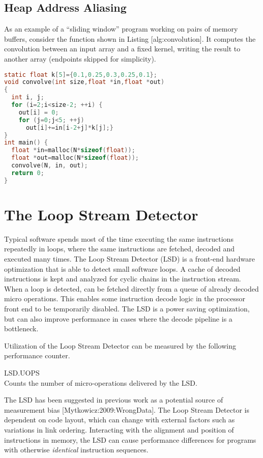 \documentclass[a4paper,11pt,twocolumn,twoside]{article}
\begin{document}
\subsection{Heap Address Aliasing}
As an example of a “sliding window” program working on pairs of memory buffers, consider the function shown in Listing [alg:convolution]. 
It computes the convolution between an input array and a fixed kernel, writing the result to another array (endpoints skipped for simplicity).

\begin{lstlisting}[language=C]
static float k[5]={0.1,0.25,0.3,0.25,0.1};
void convolve(int size,float *in,float *out)
{
  int i, j;
  for (i=2;i<size-2; ++i) {
    out[i] = 0;
    for (j=0;j<5; ++j)
      out[i]+=in[i-2+j]*k[j];}
}
int main() {
  float *in=malloc(N*sizeof(float));
  float *out=malloc(N*sizeof(float));
  convolve(N, in, out);
  return 0;
}
\end{lstlisting}



\section{The Loop Stream Detector}
Typical software spends most of the time executing the same instructions repeatedly in loops, where the same instructions are fetched, decoded and executed many times. 
The Loop Stream Detector (LSD) is a front-end hardware optimization that is able to detect small software loops.
A cache of decoded instructions is kept and analyzed for cyclic chains in the instruction stream.
When a loop is detected, can be fetched directly from a queue of already decoded micro operations.
This enables some instruction decode logic in the processor front end to be temporarily disabled.
The LSD is a power saving optimization, but can also improve performance in cases where the decode pipeline is a bottleneck.

Utilization of the Loop Stream Detector can be measured by the following performance counter.
\begin{description}
  \item{LSD.UOPS} \hfill \\
  Counts the number of micro-operations delivered by the LSD.
\end{description}

The LSD has been suggested in previous work as a potential source of measurement bias [Mytkowicz:2009:WrongData].
The Loop Stream Detector is dependent on code layout, which can change with external factors such as variations in link ordering. 
Interacting with the alignment and position of instructions in memory, the LSD can cause performance differences for programs with otherwise \emph{identical} instruction sequences.
\end{document}
